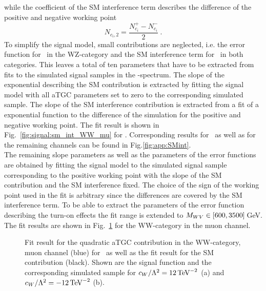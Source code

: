 while the coefficient of the SM interference term describes the difference of the positive and negative working point
\begin{equation}
N_{c_i,2} = \frac{N_{c_i}^{+}-N_{c_i}^{-}}{2} ~.
\label{eq:signal:n2}
\end{equation}
To simplify the signal model, small contributions are neglected, i.e. the error function for \Tcb \ in the WZ-category and the SM interference term for \Tcwww \ in both categories. This leaves a total of ten parameters that have to be extracted from fits to the simulated signal samples in the \MWV -spectrum. The slope of the exponential describing the SM contribution is extracted by fitting the signal model with all aTGC parameters set to zero to the corresponding simulated sample. The slope of the SM interference contribution is extracted from a fit of a exponential function to the difference of the simulation for the positive and negative working point. The fit result is shown in Fig.~\ref{fig:signal:sm_int_WW_mu} for \Tccw. Corresponding results for \Tcb \ as well as for the remaining channels can be found in Fig.\ref{fig:app:SMint}.\\


\noindent The remaining slope parameters as well as the parameters of the error functions are obtained by fitting the signal model to the simulated signal sample corresponding to the positive working point with the slope of the SM contribution and the SM interference fixed. The choice of the sign of the working point used in the fit is arbitrary since the differences are covered by the SM interference term. To be able to extract the parameters of the error function describing the turn-on effects the fit range is extended to $M_{WV} \in [600,3500]$\,GeV. The fit results are shown in Fig.~\ref{fig:signal:WW_mu_sig} for the WW-category in the muon channel.

\begin{figure}
	\centering
	\caption[Fit result for the quadratic aTGC contribution in the WW-category, muon channel]{Fit result for the quadratic aTGC contribution in the WW-category, muon channel (blue) for \Tccw \ as well as the fit result for the SM contribution (black). Shown are the signal function and the corresponding simulated sample for $c_{W}/\Lambda^2=12\,{\rm TeV}^{-2}$ (a) and $c_{W}/\Lambda^2=-12\,{\rm TeV}^{-2}$ (b).}
	\label{fig:signal:WW_mu_sig}
\end{figure}


